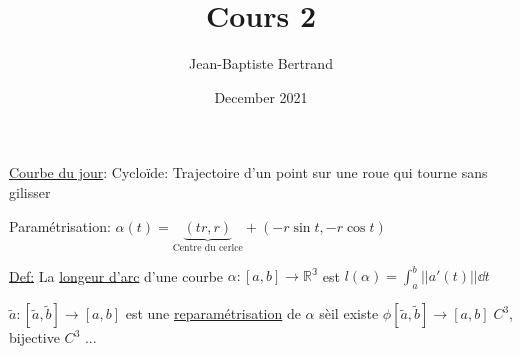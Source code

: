 \documentclass{article}
\title{Cours 2}
\author{Jean-Baptiste Bertrand}
\date{December 2021}
\begin{document}
\maketitle


\underline{Courbe du jour}: Cycloïde: Trajectoire d'un point sur une roue qui tourne sans gilisser


Paramétrisation: $\alpha(t) = \underbrace{(tr, r)}_{\text{Centre du cerlce}} + (-r\sin t, -r \cos t)$

%

\headrule

\underline{Def:} La \underline{longeur d'arc} d'une courbe $\alpha: [a,b] \to \mathbb{R^3}$ est $l(\alpha) = \int_a^b ||a'(t)|| \dd t$

$\tilde{a}:[\tilde{a}, \tilde{b}] \to [a,b]$ est une \underline{reparamétrisation} de $\alpha$ sèil existe $\phi [\tilde a, \tilde b]\to [a,b]\; C^3$, bijective $C^3$ ...
\end{document}
